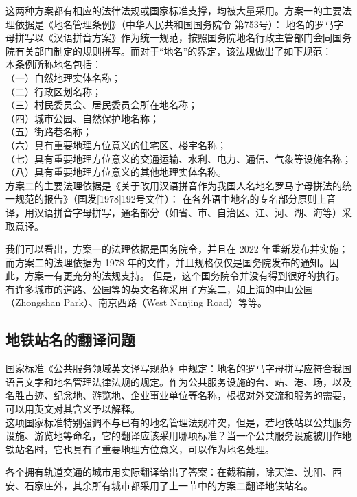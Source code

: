 \documentclass[a4paper,UTF8,12pt]{ctexart}
\begin{document}
        这两种方案都有相应的法律法规或国家标准支撑，均被大量采用。方案一的主要法理依据是《地名管理条例》（中华人民共和国国务院令 第753号）：
        地名的罗马字母拼写以《汉语拼音方案》作为统一规范，按照国务院地名行政主管部门会同国务院有关部门制定的规则拼写。\cite{ref2}而对于“地名”的界定，该法规做出了如下规范：\\本条例所称地名包括：\\
        （一）自然地理实体名称；\\
        （二）行政区划名称；\\
        （三）村民委员会、居民委员会所在地名称；\\
        （四）城市公园、自然保护地名称；\\
        （五）街路巷名称；\\
        （六）具有重要地理方位意义的住宅区、楼宇名称；\\
        （七）具有重要地理方位意义的交通运输、水利、电力、通信、气象等设施名称；\\
        （八）具有重要地理方位意义的其他地理实体名称。\cite{ref3}\\

        方案二的主要法理依据是《关于改用汉语拼音作为我国人名地名罗马字母拼法的统一规范的报告》（国发[1978]192号文件）：
        在各外语中地名的专名部分原则上音译，用汉语拼音字母拼写，通名部分（如省、市、自治区、江、河、湖、海等）采取意译。\cite{ref4}

        我们可以看出，方案一的法理依据是国务院令，并且在 2022 年重新发布并实施；而方案二的法理依据为 1978 年的文件，并且规格仅仅是国务院发布的通知。因此，方案一有更充分的法规支持。
        但是，这个国务院令并没有得到很好的执行。有许多城市的道路、公园等的英文名称采用了方案二，如上海的中山公园（Zhongshan Park）、南京西路（West Nanjing Road）等等。
    \subsection{地铁站名的翻译问题}
        国家标准《公共服务领域英文译写规范》中规定：地名的罗马字母拼写应符合我国语言文字和地名管理法律法规的规定。作为公共服务设施的台、站、港、场，以及名胜古迹、纪念地、游览地、企业事业单位等名称，根据对外交流和服务的需要，可以用英文对其含义予以解释。\cite{ref5}\\
        这项国家标准特别强调不与已有的地名管理法规冲突，但是，若地铁站以公共服务设施、游览地等命名，它的翻译应该采用哪项标准？当一个公共服务设施被用作地铁站名时，它也具有了重要地理方位意义，可以作为地名处理。

        各个拥有轨道交通的城市用实际翻译给出了答案：在截稿前，除天津、沈阳、西安、石家庄外，其余所有城市都采用了上一节中的方案二翻译地铁站名。
        
\end{document}
